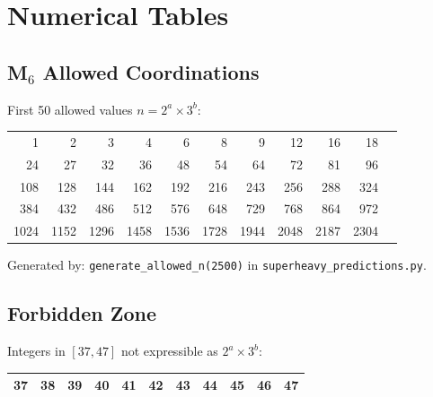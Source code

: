 
\chapter{Numerical Tables}
\label{app:tables}

\section{M$_6$ Allowed Coordinations}
\label{sec:tables:allowed}

First 50 allowed values $n = 2^a \times 3^b$:

\begin{center}
\begin{tabular}{rrrrrrrrrrr}
    \toprule
    1 & 2 & 3 & 4 & 6 & 8 & 9 & 12 & 16 & 18 \\
    24 & 27 & 32 & 36 & 48 & 54 & 64 & 72 & 81 & 96 \\
    108 & 128 & 144 & 162 & 192 & 216 & 243 & 256 & 288 & 324 \\
    384 & 432 & 486 & 512 & 576 & 648 & 729 & 768 & 864 & 972 \\
    1024 & 1152 & 1296 & 1458 & 1536 & 1728 & 1944 & 2048 & 2187 & 2304 \\
    \bottomrule
\end{tabular}
\end{center}

Generated by: \texttt{generate\_allowed\_n(2500)} in \texttt{superheavy\_predictions.py}.

\section{Forbidden Zone}
\label{sec:tables:forbidden}

Integers in $[37, 47]$ not expressible as $2^a \times 3^b$:

\begin{center}
\begin{tabular}{rrrrrrrrrrr}
    \toprule
    37 & 38 & 39 & 40 & 41 & 42 & 43 & 44 & 45 & 46 & 47 \\
    \bottomrule
\end{tabular}
\end{center}

